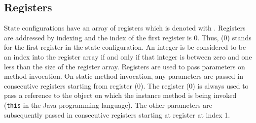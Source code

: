 \subsection{Registers}\label{register}
State configurations have an array of registers which is
 denoted with    
\locVarOnly. Registers are addressed by indexing and 
 the index of the first register  is 0. 
Thus, \locVarOnly(0) stands for the first register in the state configuration.
 An integer is be considered to be an index into the register array if and only if that integer is between zero and one less than the size of the register array.
Registers are used to pass parameters on method invocation. On static method
 invocation, any parameters are passed in consecutive registers starting from register \locVarOnly(0). The register \locVarOnly(0) is always used to pass a
 reference to the object on which the instance method is being invoked
 (\texttt{this} in the Java programming language). 
The other parameters are subsequently passed in consecutive registers starting at register at index 1.
